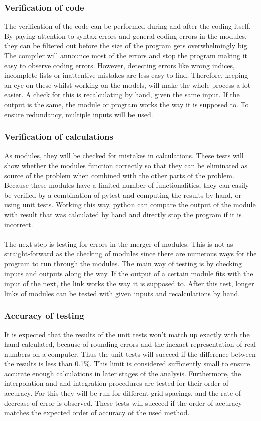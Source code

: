 \subsubsection{Verification of code} The verification of the code can be performed during and after the coding itself. By paying attention to syntax errors and general coding errors in the modules, they can be filtered out before the size of the program gets overwhelmingly big. The compiler will announce most of the errors and stop the program making it easy to observe coding errors. However, detecting errors like wrong indices, incomplete lists or inattentive mistakes are less easy to find. Therefore, keeping an eye on these whilst working on the models, will make the whole process a lot easier. A check for this is recalculating by hand, given the same input. If the output is the same, the module or program works the way it is supposed to. To ensure redundancy, multiple inputs will be used.
\subsubsection{Verification of calculations}
As modules, they will be checked for mistakes in calculations. These tests will show whether the modules function correctly so that they can be eliminated as source of the problem when combined with the other parts of the problem. Because these modules have a limited number of functionalities, they can easily be verified by a combination of pytest and computing the results by hand, or using unit tests. Working this way, python can compare the output of the module with result that was calculated by hand and directly stop the program if it is incorrect.\\ \\
The next step is testing for errors in the merger of modules. This is not as straight-forward as the checking of modules since there are numerous ways for the program to run through the modules. The main way of testing is by checking inputs and outputs along the way. If the output of a certain module fits with the input of the next, the link works the way it is supposed to. After this test, longer links of modules can be tested with given inputs and recalculations by hand.

\subsubsection{Accuracy of testing}
It is expected that the results of the unit tests won't match up exactly with the hand-calculated, because of rounding errors and the inexact representation of real numbers on a computer. Thus the unit tests will succeed if the difference between the results is less than 0.1\%. This limit is considered sufficiently small to ensure accurate enough calculations in later stages of the analysis. Furthermore, the interpolation and and integration procedures are tested for their order of accuracy. For this they will be run for different grid spacings, and the rate of decrease of error is observed. These tests will succeed if the order of accuracy matches the expected order of accuracy of the used method.

